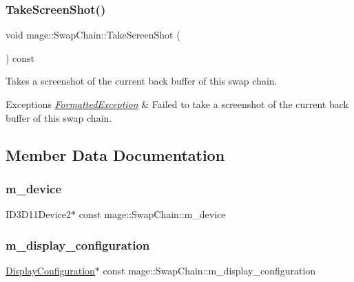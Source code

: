 \subsubsection{\texorpdfstring{Take\+Screen\+Shot()}{TakeScreenShot()}}
{\footnotesize\ttfamily void mage\+::\+Swap\+Chain\+::\+Take\+Screen\+Shot (\begin{DoxyParamCaption}{ }\end{DoxyParamCaption}) const}

Takes a screenshot of the current back buffer of this swap chain.


\begin{DoxyExceptions}{Exceptions}
{\em \hyperlink{structmage_1_1_formatted_exception}{Formatted\+Exception}} & Failed to take a screenshot of the current back buffer of this swap chain. \\
\hline
\end{DoxyExceptions}


\subsection{Member Data Documentation}
\hypertarget{classmage_1_1_swap_chain_aa9b2db7026b84c37e94dad44566a0208}{}\label{classmage_1_1_swap_chain_aa9b2db7026b84c37e94dad44566a0208} 
\subsubsection{\texorpdfstring{m\+\_\+device}{m\_device}}
{\footnotesize\ttfamily I\+D3\+D11\+Device2$\ast$ const mage\+::\+Swap\+Chain\+::m\+\_\+device\hspace{0.3cm}{\ttfamily [private]}}

\hypertarget{classmage_1_1_swap_chain_ac1aa833943aa6bfe464da32316f7096f}{}\label{classmage_1_1_swap_chain_ac1aa833943aa6bfe464da32316f7096f} 
\subsubsection{\texorpdfstring{m\+\_\+display\+\_\+configuration}{m\_display\_configuration}}
{\footnotesize\ttfamily \hyperlink{structmage_1_1_display_configuration}{Display\+Configuration}$\ast$ const mage\+::\+Swap\+Chain\+::m\+\_\+display\+\_\+configuration\hspace{0.3cm}{\ttfamily [private]}}

